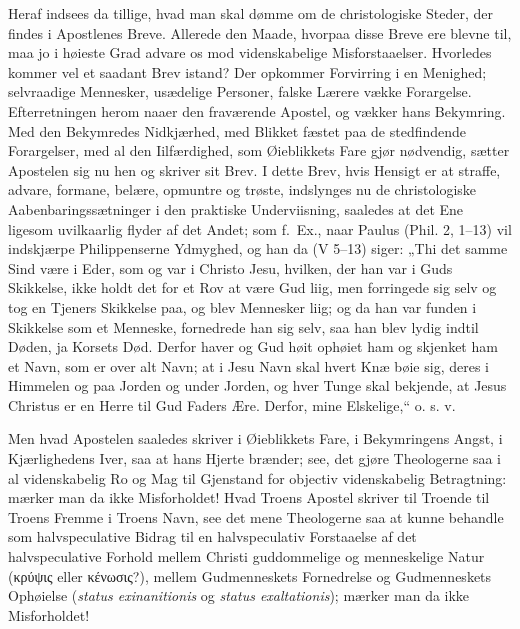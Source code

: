 \documentclass[12pt,a4paper]{book}
\newcommand{\opage}[1]{\marginnote{\footnotesize\textit{[#1]}}}
\begin{document}
\opage{105} Heraf indsees da tillige, hvad man skal dømme om de christologiske Steder,
der findes i Apostlenes Breve. Allerede den Maade, hvorpaa disse Breve ere
blevne til, maa jo i høieste Grad advare os mod videnskabelige
Misforstaaelser. Hvorledes kommer vel et saadant Brev istand? Der opkommer
Forvirring i en Menighed; selvraadige Mennesker, usædelige Personer, falske
Lærere vække Forargelse. Efterretningen herom naaer den fraværende Apostel,
og vækker hans Bekymring. Med den Bekymredes Nidkjærhed, med Blikket fæstet
paa de stedfindende Forargelser, med al den Iilfærdighed, som Øieblikkets
Fare gjør nødvendig, sætter Apostelen sig nu hen og skriver sit Brev. I
dette Brev, hvis Hensigt er at straffe, advare, formane, belære, opmuntre
og trøste, indslynges nu de christologiske Aabenbaringssætninger i den
praktiske Underviisning, saaledes at det Ene ligesom uvilkaarlig flyder af
det Andet; som f.~Ex., naar Paulus (Phil. 2, 1--13) vil indskjærpe
Philippenserne Ydmyghed, og han da (V 5--13) siger: „Thi det samme Sind
være i Eder, som og var i Christo Jesu, hvilken, der han var i Guds
Skikkelse, ikke holdt det for et Rov at være Gud liig, men forringede sig
selv og tog en Tjeners Skikkelse paa, og blev Mennesker liig; og da han var
funden i Skikkelse som et Menneske, fornedrede han sig selv, saa han blev
lydig indtil Døden, ja Korsets Død. Derfor haver og Gud høit ophøiet ham og
skjenket ham et Navn, som er over alt Navn; at i Jesu Navn skal hvert Knæ
bøie sig, deres i Himmelen og paa Jorden og under Jorden, og hver Tunge
skal bekjende, at Jesus Christus er en Herre til Gud Faders Ære. Derfor,
mine Elskelige,“ o. s. v.

Men hvad Apostelen saaledes skriver i Øieblikkets Fare, i Bekymringens
Angst, i Kjærlighedens Iver, saa at hans Hjerte brænder; see, det gjøre
Theologerne saa i al videnskabelig Ro og Mag til Gjenstand for objectiv
videnskabelig Betragtning: mærker
\opage{106} man da ikke Misforholdet! Hvad Troens Apostel skriver til Troende til
Troens Fremme i Troens Navn, see det mene Theologerne saa at kunne behandle
som halvspeculative Bidrag til en halvspeculativ Forstaaelse af det
halvspeculative Forhold mellem Christi guddommelige og menneskelige Natur
(κρύψις eller κένωσις?), mellem Gudmenneskets Fornedrelse og Gudmenneskets
Ophøielse (\textit{status exinanitionis} og \textit{status exaltationis});
mærker man da ikke Misforholdet!
\end{document}
